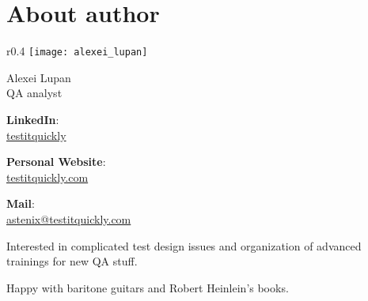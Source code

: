 \section*{About author}
\label{sec:About author}

\begingroup

\setlength{\intextsep}{-0.4em}
\setlength{\columnsep}{3em}

\begin{wrapfigure}[0]{r}{0.4\linewidth}
  \centering\texttt{[image: alexei\_lupan]}
\end{wrapfigure}

{\Large Alexei Lupan}\\
QA analyst

\textbf{LinkedIn}:\\
\href{https://www.linkedin.com/in/testitquickly/}{testitquickly}

\textbf{Personal Website}:\\
\href{https://testitquickly.com/}{testitquickly.com}
 
\textbf{Mail}:\\
\href{mailto:astenix@testitquickly.com}{astenix@testitquickly.com} 


Interested in complicated test design issues and organization of advanced trainings for new QA stuff.

Happy with baritone guitars and Robert Heinlein's books.                                                                                                                                                                                                    

\endgroup
